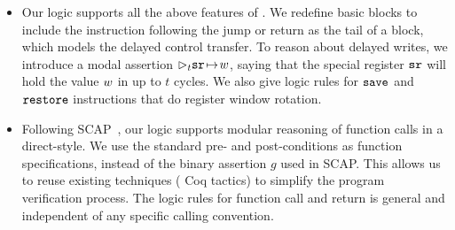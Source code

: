 
\begin{itemize}
	\item
    Our logic supports all the above features of \sparc.
    We redefine basic blocks to include the instruction
    following the jump or return as the tail of a
    block, which models the delayed control
    transfer. To reason about delayed writes, we introduce
    a modal assertion $\rhd_{t}{\texttt{sr}} \!\mapsto\! {w}$, saying that
    the special register $\texttt{sr}$ will
    hold the value $w$ in up to $t$ cycles.
    We also give
    logic rules for $\texttt{save}$ and $\texttt{restore}$ instructions 
    that do register window rotation.
%
%
	
	\item
    Following SCAP~\cite{Feng06pldi}, our logic supports
    modular reasoning of function calls in a direct-style.
    We use the standard pre- and post-conditions as function
    specifications, instead of the binary assertion $g$ used
    in SCAP. This allows us to reuse existing techniques
    (\eg{} Coq tactics) to simplify the program
    verification process.
    The logic rules for function call and return is general
    and independent of any specific calling convention.
	

\end{itemize}
